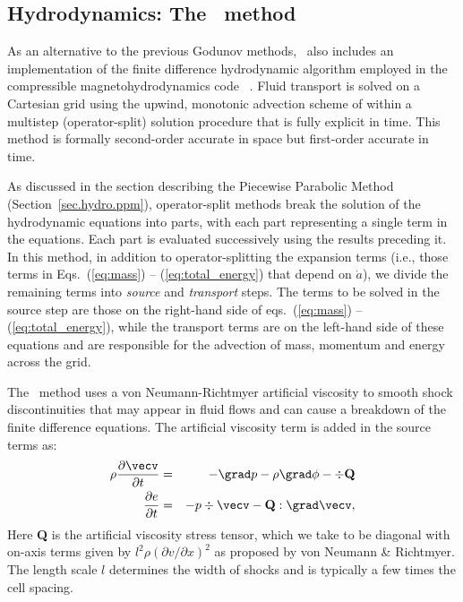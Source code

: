\subsection{Hydrodynamics: The \zeus\ method}
\label{sec.hydro.zeus}

As an alternative to the previous Godunov methods, \enzo\ also
includes an implementation of the finite difference hydrodynamic
algorithm employed in the compressible magnetohydrodynamics code
\zeus\ \citep{Stone92a, Stone92b}.  Fluid transport is solved on a
Cartesian grid using the upwind, monotonic advection scheme of
\citet{1977JCoPh..23..276V} within a multistep (operator-split)
solution procedure that is fully explicit in time.  This method is
formally second-order accurate in space but first-order accurate in
time.  
 
As discussed in the section describing the Piecewise Parabolic Method
(Section~\ref{sec.hydro.ppm}), operator-split methods break the
solution of the hydrodynamic equations into parts, with each part
representing a single term in the equations.  Each part is evaluated
successively using the results preceding it.  In this method, in
addition to operator-splitting the expansion terms (i.e., those terms
in Eqs.~(\ref{eq:mass}) -- (\ref{eq:total_energy}) that depend on
$\dot{a}$), we divide the remaining terms into \emph{source} and
\emph{transport} steps.  The terms to be solved in the source step are
those on the right-hand side of eqs.~(\ref{eq:mass}) --
(\ref{eq:total_energy}), while the transport terms are on the
left-hand side of these equations and are responsible for the
advection of mass, momentum and energy across the grid.

The \zeus\ method uses a von Neumann-Richtmyer artificial viscosity to
smooth shock discontinuities that may appear in fluid flows and can
cause a breakdown of the finite difference equations.  The artificial
viscosity term is added in the source terms as:
\begin{eqnarray}
\rho \frac{\partial\vecv}{\partial t} &=& - \grad p - \rho \grad \phi 
- \div \textbf{Q} \\
\frac{\partial e}{\partial t} &=& -p \div \vecv - \textbf{Q} : \grad \vecv, 
\end{eqnarray}
Here \textbf{Q} is the artificial viscosity stress tensor, which we
take to be diagonal with on-axis terms given by $l^2 \rho (\partial v
/ \partial x)^2$ as proposed by von Neumann \& Richtmyer.  The length
scale $l$ determines the width of shocks and is typically a few times
the cell spacing.

